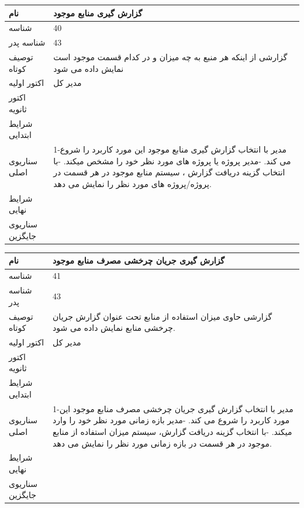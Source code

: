 \newpage

\begin{tabular}{|p{2cm}|p{10cm}|}
\hline
نام
&
گزارش گیری منابع موجود
\\
\hline
شناسه
&
40
\\
\hline
شناسه پدر
&
43
\\
\hline
توصیف کوتاه
&
گزارشی از اینکه هر منبع به چه میزان و در کدام قسمت موجود است نمایش داده می شود
\\
\hline
اکتور اولیه
&
مدیر کل
\\
\hline
اکتور ثانویه
&

\\
\hline
شرایط ابتدایی
&

\\
\hline
سناریوی اصلی
&
1-مدیر با انتخاب گزارش گیری منابع موجود  این مورد کاربرد را شروع می کند.
\newline
2-مدیر پروژه یا پروژه های مورد نظر خود را مشخص میکند.
\newline
3-با انتخاب گزینه دریافت گزارش ، سیستم منابع موجود در هر قسمت در پروژه/پروژه های مورد نظر را نمایش می دهد. 
\\
\hline
شرایط نهایی
&

\\
\hline
سناریوی جایگزین
&

\\
\hline
\end{tabular}

\vspace{2cm}

\begin{tabular}{|p{2cm}|p{10cm}|}
\hline
نام
&
گزارش گیری جریان چرخشی مصرف منابع موجود
\\
\hline
شناسه
&
41
\\
\hline
شناسه پدر
&
43
\\
\hline
توصیف کوتاه
&
گزارشی حاوی میزان استفاده از منابع تحت عنوان گزارش جریان چرخشی منابع نمایش داده می شود.
\\
\hline
اکتور اولیه
&
مدیر کل
\\
\hline
اکتور ثانویه
&

\\
\hline
شرایط ابتدایی
&

\\
\hline
سناریوی اصلی
&
1-مدیر با انتخاب گزارش گیری جریان چرخشی مصرف منابع موجود این مورد کاربرد را شروع می کند.
\newline
2-مدیر بازه زمانی مورد نظر خود را وارد میکند.
\newline
3-با انتخاب گزینه دریافت گزارش، سیستم میزان استفاده از منابع موجود در هر قسمت در بازه زمانی مورد نظر را نمایش می دهد. 
\\
\hline
شرایط نهایی
&

\\
\hline
سناریوی جایگزین
&

\\
\hline
\end{tabular}

